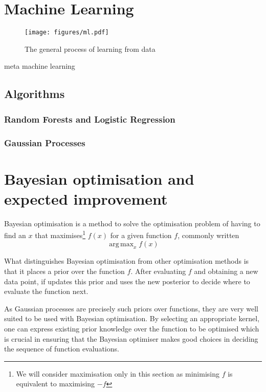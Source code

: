\documentclass[a4paper,12pt,twoside,openright]{report}
\DeclareMathOperator*{\argmax}{arg\,max}
\begin{document}
\section{Machine Learning}
\begin{figure}
\centering
  \texttt{[image: figures/ml.pdf]}
  \caption{The general process of learning from data}
  \label{mlstructure}
\end{figure}

meta machine learning

\subsection{Algorithms}

\subsubsection{Random Forests and Logistic Regression}

\subsubsection{Gaussian Processes}

\section{Bayesian optimisation and expected improvement}
Bayesian optimisation is a method to solve the optimisation problem of having to find an $x$ that maximises\footnote{We will consider maximisation only in this section as minimising $f$ is equivalent to maximising $-f$} $f(x)$ for a given function $f$, commonly written 
\begin{equation}
\argmax_x f(x)
\end{equation}

What distinguishes Bayesian optimisation from other optimisation methods is that it places a prior over the function $f$. After evaluating $f$ and obtaining a new data point, if updates this prior and uses the new posterior to decide where to evaluate the function next.

As Gaussian processes are precisely such priors over functions, they are very well suited to be used with Bayesian optimisation. By selecting an appropriate kernel, one can express existing prior knowledge over the function to be optimised which is crucial in ensuring that the Bayesian optimiser makes good choices in deciding the sequence of function evaluations.
\end{document}
